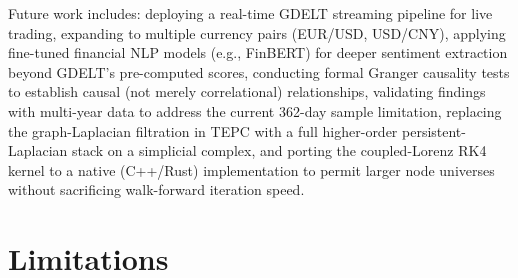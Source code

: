 \documentclass[11pt]{article}
\begin{document}
Future work includes: deploying a real-time GDELT streaming pipeline for live trading, expanding to multiple currency pairs (EUR/USD, USD/CNY), applying fine-tuned financial NLP models (e.g., FinBERT) for deeper sentiment extraction beyond GDELT's pre-computed scores, conducting formal Granger causality tests to establish causal (not merely correlational) relationships, validating findings with multi-year data to address the current 362-day sample limitation, replacing the graph-Laplacian filtration in TEPC with a full higher-order persistent-Laplacian stack on a simplicial complex, and porting the coupled-Lorenz RK4 kernel to a native (C++/Rust) implementation to permit larger node universes without sacrificing walk-forward iteration speed.

\section*{Limitations}
\label{sec:limitations}
\end{document}
